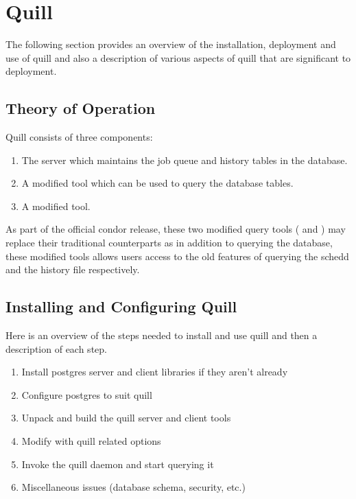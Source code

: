 \section{\label{sec:Quill}Quill}

The following section provides an overview of the installation, deployment
and use of quill and also a description of various aspects of quill that
are significant to deployment.

\subsection{\label{sec:Quill-TOE}Theory of Operation}
Quill consists of three components: 

\begin{enumerate}
\item The  server which maintains the job queue and history
		tables in the database.

\item A modified  tool which can be used to query the database
		tables.

\item A modified  tool.

\end{enumerate}

As part of the official condor release, these two modified query tools
( and ) may replace their traditional counterparts
as in addition to querying the database, these modified tools allows
users access to the old features of querying the schedd and the history
file respectively.

\subsection{\label{sec:Quill-Installation}Installing and Configuring Quill}

Here is an overview of the steps needed to install and use quill and then
a description of each step.

\begin{enumerate}
\item Install postgres server and client libraries if they aren't already
\item Configure postgres to suit quill
\item Unpack and build the quill server and client tools
\item Modify  with quill related options
\item Invoke the quill daemon and start querying it
\item Miscellaneous issues (database schema, security, etc.)
\end{enumerate}

